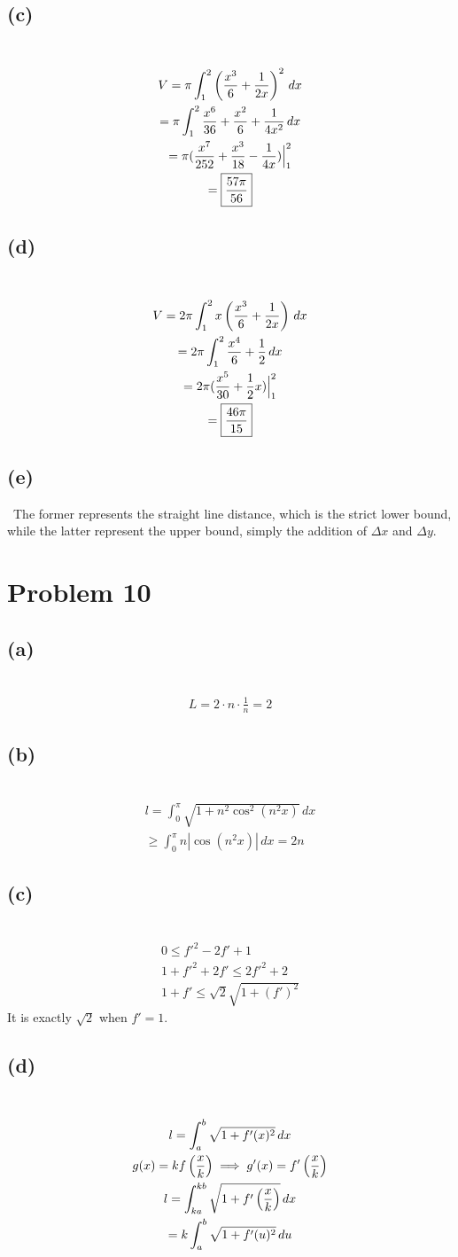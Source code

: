\documentclass[12pt]{article}
\newcommand*{\paren}[1]{\ensuremath\left(#1\right)}
\newcommand{\at}{\Big|}
\newcommand{\vem}{\vspace{0.5em}}
\newcommand{\problem}[1]{\section{Problem #1}}
\newcommand{\subproblem}[1]{\subsection{(#1)} \,}
\begin{document}
\subproblem{c}
\begin{gather*}
    V=\pi \int_1^2 \paren{\frac{x^3}{6}+\frac{1}{2x}}^2 \, dx\\
    = \pi \int_1^2 \frac{x^6}{36} + \frac{x^2}{6} + \frac{1}{4x^2} \, dx\\
    = \pi (\frac{x^7}{252}+\frac{x^3}{18} - \frac{1}{4x})\at_1^2\\
    = \boxed{ \frac{57\pi}{56}}
\end{gather*}

\subproblem{d}
\begin{gather*}
    V=2\pi \int_1^2 x\paren{\frac{x^3}{6}+\frac{1}{2x}} \, dx\\
    = 2\pi \int_1^2\frac{x^4}{6} + \frac{1}{2} \, dx\\
    = 2\pi ( \frac{x^5}{30} + \frac{1}{2}x)\at_1^2\\
    = \boxed{ \frac{46\pi}{15}}
\end{gather*}

\subproblem{e}
The former represents the straight line distance, which is the strict lower bound, while the latter represent the upper bound, simply the addition of $\Delta x$ and $\Delta y$.

\problem{10}

\subproblem{a}
\begin{gather*}
    L=2\cdot n\cdot \frac{1}{n}=\boxed{2}
\end{gather*}

\subproblem{b}
\begin{gather*}
    l = \int_0^\pi \sqrt{1+n^2\cos^2(n^2 x)} \, dx\\
    \ge \int_0^\pi n|\cos (n^2 x)|\, dx=2n
\end{gather*}

\subproblem{c}
\begin{gather*}
    0 \le f'^2-2f'+1\\
    1+f'^2+2f'\le 2f'^2+2\\
    1+f' \le \sqrt{2} \sqrt{1+(f')^2}
\end{gather*}
It is exactly $\sqrt{2}$ when $f'=1$.\vem

\subproblem{d}
\begin{gather*}
    l=\int_a^b \sqrt{1+f'(x)^2} \, dx\\
    g(x)=k f\paren{\frac{x}{k}} \implies g'(x)=f'\paren{\frac{x}{k}}\\
    l= \int_{ka}^{kb} \sqrt{1+f'\paren{\frac{x}{k}}} \, dx\\
    = k\int_a^b \sqrt{1+f'(u)^2} \, du
\end{gather*}
\end{document}
